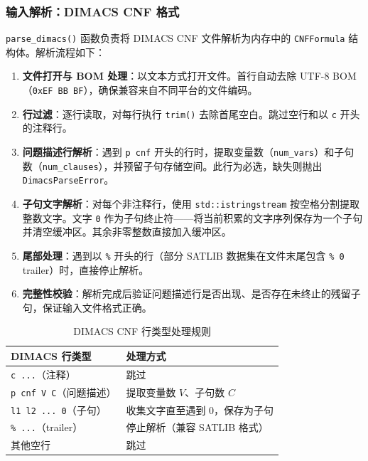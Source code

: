 \documentclass[12pt,a4paper]{article}
\begin{document}
\subsubsection{输入解析：DIMACS CNF 格式}

\texttt{parse\_dimacs()} 函数负责将 DIMACS CNF 文件解析为内存中的 \texttt{CNFFormula} 结构体。解析流程如下：

\begin{enumerate}[label=(\arabic*)]
    \item \textbf{文件打开与 BOM 处理}：以文本方式打开文件。首行自动去除 UTF-8 BOM（\texttt{0xEF BB BF}），确保兼容来自不同平台的文件编码。
    \item \textbf{行过滤}：逐行读取，对每行执行 \texttt{trim()} 去除首尾空白。跳过空行和以 \texttt{c} 开头的注释行。
    \item \textbf{问题描述行解析}：遇到 \texttt{p cnf} 开头的行时，提取变量数（\texttt{num\_vars}）和子句数（\texttt{num\_clauses}），并预留子句存储空间。此行为必选，缺失则抛出 \texttt{DimacsParseError}。
    \item \textbf{子句文字解析}：对每个非注释行，使用 \texttt{std::istringstream} 按空格分割提取整数文字。文字 \texttt{0} 作为子句终止符——将当前积累的文字序列保存为一个子句并清空缓冲区。其余非零整数直接加入缓冲区。
    \item \textbf{尾部处理}：遇到以 \texttt{\%} 开头的行（部分 SATLIB 数据集在文件末尾包含 \texttt{\% 0} trailer）时，直接停止解析。
    \item \textbf{完整性校验}：解析完成后验证问题描述行是否出现、是否存在未终止的残留子句，保证输入文件格式正确。
\end{enumerate}

\begin{table}[H]
\centering
\renewcommand{\arraystretch}{1.3}
\begin{tabular}{ll}
\toprule
\textbf{DIMACS 行类型} & \textbf{处理方式} \\
\midrule
\texttt{c ...}（注释）      & 跳过 \\
\texttt{p cnf V C}（问题描述） & 提取变量数 $V$、子句数 $C$ \\
\texttt{l1 l2 ... 0}（子句） & 收集文字直至遇到 0，保存为子句 \\
\texttt{\% ...}（trailer）   & 停止解析（兼容 SATLIB 格式） \\
其他空行                    & 跳过 \\
\bottomrule
\end{tabular}
\caption{DIMACS CNF 行类型处理规则}
\label{tab:dimacs_lines}
\end{table}
\end{document}
